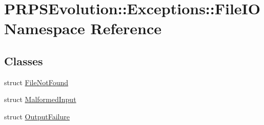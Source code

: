 \hypertarget{namespace_p_r_p_s_evolution_1_1_exceptions_1_1_file_i_o}{\section{\-P\-R\-P\-S\-Evolution\-:\-:\-Exceptions\-:\-:\-File\-I\-O \-Namespace \-Reference}
\label{namespace_p_r_p_s_evolution_1_1_exceptions_1_1_file_i_o}
}
\subsection*{\-Classes}
\begin{DoxyCompactItemize}
\item 
struct \hyperlink{struct_p_r_p_s_evolution_1_1_exceptions_1_1_file_i_o_1_1_file_not_found}{\-File\-Not\-Found}
\item 
struct \hyperlink{struct_p_r_p_s_evolution_1_1_exceptions_1_1_file_i_o_1_1_malformed_input}{\-Malformed\-Input}
\item 
struct \hyperlink{struct_p_r_p_s_evolution_1_1_exceptions_1_1_file_i_o_1_1_output_failure}{\-Output\-Failure}
\end{DoxyCompactItemize}
